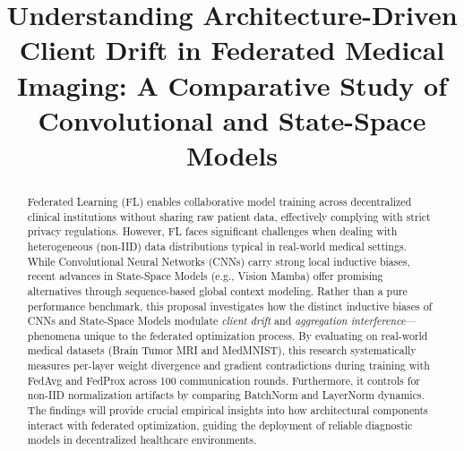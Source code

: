 \documentclass[conference]{IEEEtran}
\begin{document}
\title{Understanding Architecture-Driven Client Drift in Federated Medical Imaging: A Comparative Study of Convolutional and State-Space Models}

\author{
\and
{}
}

\maketitle

\begin{abstract}
Federated Learning (FL) enables collaborative model training across decentralized clinical institutions without sharing raw patient data, effectively complying with strict privacy regulations. However, FL faces significant challenges when dealing with heterogeneous (non-IID) data distributions typical in real-world medical settings. While Convolutional Neural Networks (CNNs) carry strong local inductive biases, recent advances in State-Space Models (e.g., Vision Mamba) offer promising alternatives through sequence-based global context modeling. Rather than a pure performance benchmark, this proposal investigates how the distinct inductive biases of CNNs and State-Space Models modulate \textit{client drift} and \textit{aggregation interference}—phenomena unique to the federated optimization process. By evaluating on real-world medical datasets (Brain Tumor MRI and MedMNIST), this research systematically measures per-layer weight divergence and gradient contradictions during training with FedAvg and FedProx across 100 communication rounds. Furthermore, it controls for non-IID normalization artifacts by comparing BatchNorm and LayerNorm dynamics. The findings will provide crucial empirical insights into how architectural components interact with federated optimization, guiding the deployment of reliable diagnostic models in decentralized healthcare environments.
\end{abstract}
\end{document}
